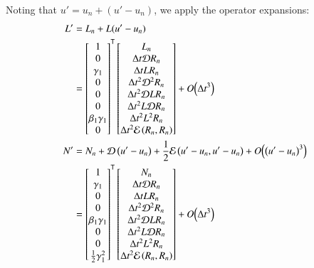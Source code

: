 \documentclass[letterpaper,11pt]{amsart}
\newcommand{\trans}[1]{{#1}^{\ensuremath{\mathsf{T}}}}
\newcommand{\order}[2]{\ensuremath{O\!\left( {#1}^{#2} \right)}}
\begin{document}
Noting that $u' = u_{n} + \left( u' - u_{n} \right)$,
we apply the operator expansions:
\begin{subequations}
\begin{align}
  L'
  &=
  L_{n}
  +
  L(u'-u_{n})
\\
&=
\trans{\begin{bmatrix}
  1 \\
  0 \\
  \gamma_{1} \\
  0 \\
  0 \\
  0 \\
  \beta_{1} \gamma_{1} \\
  0
\end{bmatrix}}
\begin{bmatrix}
  L_{n} \\
  \Delta{}t \mathcal{D} R_{n} \\
  \Delta{}t L R_{n} \\
  \Delta{}t^{2} \mathcal{D}^{2} R_{n} \\
  \Delta{}t^{2} \mathcal{D} L R_{n} \\
  \Delta{}t^{2} L \mathcal{D} R_{n} \\
  \Delta{}t^{2} L^{2} R_{n} \\
  \Delta{}t^{2} \mathcal{E}\left( R_{n}, R_{n} \right)
\end{bmatrix}
  + \order{\Delta{}t}{3}
\notag
\\
  N'
  &=
  N_{n}
  + \mathcal{D}\left( u'-u_{n} \right)
  + \frac{1}{2} \mathcal{E}\left( u'-u_{n}, u'-u_{n} \right)
  + \order{\left(u'-u_{n}\right)}{3}
\\
  &=
\trans{\begin{bmatrix}
  1 \\
  \gamma_{1} \\
  0 \\
  0 \\
  \beta_{1} \gamma_{1} \\
  0 \\
  0 \\
  \frac{1}{2} \gamma_{1}^{2}
\end{bmatrix}}
\begin{bmatrix}
  N_{n} \\
  \Delta{}t \mathcal{D} R_{n} \\
  \Delta{}t L R_{n} \\
  \Delta{}t^{2} \mathcal{D}^{2} R_{n} \\
  \Delta{}t^{2} \mathcal{D} L R_{n} \\
  \Delta{}t^{2} L \mathcal{D} R_{n} \\
  \Delta{}t^{2} L^{2} R_{n} \\
  \Delta{}t^{2} \mathcal{E}\left( R_{n}, R_{n} \right)
\end{bmatrix}
  + \order{\Delta{}t}{3}
  \notag
\end{align}
\end{subequations}
\end{document}
